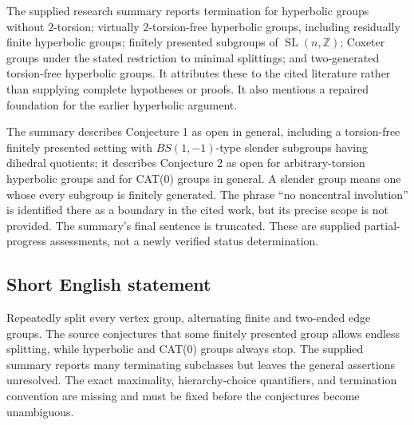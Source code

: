 \documentclass[11pt]{article}
\newcommand{\Z}{\mathbb{Z}}
\begin{document}
The supplied research summary reports termination for hyperbolic groups without $2$-torsion; virtually $2$-torsion-free hyperbolic groups, including residually finite hyperbolic groups; finitely presented subgroups of $\operatorname{SL}(n,\Z)$; Coxeter groups under the stated restriction to minimal splittings; and two-generated torsion-free hyperbolic groups. It attributes these to the cited literature rather than supplying complete hypotheses or proofs. It also mentions a repaired foundation for the earlier hyperbolic argument.

The summary describes Conjecture 1 as open in general, including a torsion-free finitely presented setting with $BS(1,-1)$-type slender subgroups having dihedral quotients; it describes Conjecture 2 as open for arbitrary-torsion hyperbolic groups and for CAT(0) groups in general. A slender group means one whose every subgroup is finitely generated. The phrase ``no noncentral involution'' is identified there as a boundary in the cited work, but its precise scope is not provided. The summary's final sentence is truncated. These are supplied partial-progress assessments, not a newly verified status determination.
\subsection{Short English statement}
Repeatedly split every vertex group, alternating finite and two-ended edge groups. The source conjectures that some finitely presented group allows endless splitting, while hyperbolic and CAT(0) groups always stop. The supplied summary reports many terminating subclasses but leaves the general assertions unresolved. The exact maximality, hierarchy-choice quantifiers, and termination convention are missing and must be fixed before the conjectures become unambiguous.
\end{document}
